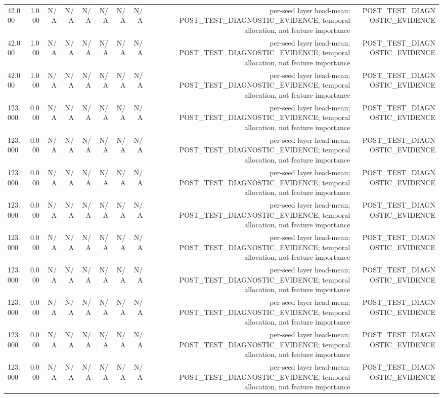 \begin{table}[h!]
\begin{tabular}{lrrrrrrrrr}
42.000 & 1.000 & N/A & N/A & N/A & N/A & N/A & N/A & per-seed layer head-mean; POST\_TEST\_DIAGNOSTIC\_EVIDENCE; temporal allocation, not feature importance & POST\_TEST\_DIAGNOSTIC\_EVIDENCE \\
42.000 & 1.000 & N/A & N/A & N/A & N/A & N/A & N/A & per-seed layer head-mean; POST\_TEST\_DIAGNOSTIC\_EVIDENCE; temporal allocation, not feature importance & POST\_TEST\_DIAGNOSTIC\_EVIDENCE \\
42.000 & 1.000 & N/A & N/A & N/A & N/A & N/A & N/A & per-seed layer head-mean; POST\_TEST\_DIAGNOSTIC\_EVIDENCE; temporal allocation, not feature importance & POST\_TEST\_DIAGNOSTIC\_EVIDENCE \\
123.000 & 0.000 & N/A & N/A & N/A & N/A & N/A & N/A & per-seed layer head-mean; POST\_TEST\_DIAGNOSTIC\_EVIDENCE; temporal allocation, not feature importance & POST\_TEST\_DIAGNOSTIC\_EVIDENCE \\
123.000 & 0.000 & N/A & N/A & N/A & N/A & N/A & N/A & per-seed layer head-mean; POST\_TEST\_DIAGNOSTIC\_EVIDENCE; temporal allocation, not feature importance & POST\_TEST\_DIAGNOSTIC\_EVIDENCE \\
123.000 & 0.000 & N/A & N/A & N/A & N/A & N/A & N/A & per-seed layer head-mean; POST\_TEST\_DIAGNOSTIC\_EVIDENCE; temporal allocation, not feature importance & POST\_TEST\_DIAGNOSTIC\_EVIDENCE \\
123.000 & 0.000 & N/A & N/A & N/A & N/A & N/A & N/A & per-seed layer head-mean; POST\_TEST\_DIAGNOSTIC\_EVIDENCE; temporal allocation, not feature importance & POST\_TEST\_DIAGNOSTIC\_EVIDENCE \\
123.000 & 0.000 & N/A & N/A & N/A & N/A & N/A & N/A & per-seed layer head-mean; POST\_TEST\_DIAGNOSTIC\_EVIDENCE; temporal allocation, not feature importance & POST\_TEST\_DIAGNOSTIC\_EVIDENCE \\
123.000 & 0.000 & N/A & N/A & N/A & N/A & N/A & N/A & per-seed layer head-mean; POST\_TEST\_DIAGNOSTIC\_EVIDENCE; temporal allocation, not feature importance & POST\_TEST\_DIAGNOSTIC\_EVIDENCE \\
123.000 & 0.000 & N/A & N/A & N/A & N/A & N/A & N/A & per-seed layer head-mean; POST\_TEST\_DIAGNOSTIC\_EVIDENCE; temporal allocation, not feature importance & POST\_TEST\_DIAGNOSTIC\_EVIDENCE \\
123.000 & 0.000 & N/A & N/A & N/A & N/A & N/A & N/A & per-seed layer head-mean; POST\_TEST\_DIAGNOSTIC\_EVIDENCE; temporal allocation, not feature importance & POST\_TEST\_DIAGNOSTIC\_EVIDENCE \\
123.000 & 0.000 & N/A & N/A & N/A & N/A & N/A & N/A & per-seed layer head-mean; POST\_TEST\_DIAGNOSTIC\_EVIDENCE; temporal allocation, not feature importance & POST\_TEST\_DIAGNOSTIC\_EVIDENCE \\

\end{tabular}
\end{table}
